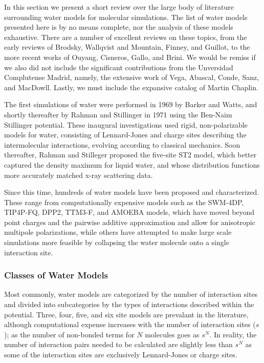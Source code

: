 In this section we present a short review over the large body of
literature surrounding water models for molecular simulations. The
list of water models presented here is by no means complete, nor the
analysis of these models exhaustive. There are a number of excellent
reviews on these topics, from the early reviews of
Brodsky\cite{Brodsky1996}, Wallqvist and Mountain\cite{Wallqvist1999},
Finney\cite{Finney2001}, and Guillot\cite{Guillot2002}, to the more
recent works of Ouyang\cite{Ouyang2015}, Cisneros\cite{Cisneros2016},
Gallo\cite{Gallo2016}, and Brini\cite{Brini2017}. We would be remiss
if we also did not include the significant contributions from the
Unversidad Complutense Madrid, namely, the extensive work of Vega,
Abascal, Conde, Sanz, and
MacDowll.\cite{MacDowell2004,Vega2005,Vega2005c,Abascal2007,Abascal2007a,Abascal2007b,Abascal2007c,Vega2009,Vega2011,Vega2011a,Vega2015}
Lastly, we must include the expansive catalog of Martin
Chaplin.\cite{Chaplin2018}

The first simulations of water were performed in 1969 by Barker and
Watts,\cite{Barker1969} and shortly thereafter by Rahman and
Stillinger in 1971\cite{Rahman1971} using the Ben-Naim Stillinger
potential\cite{Ben-Naim1972}. These inaugural investigations used
rigid, non-polarizable models for water, consisting of Lennard-Jones
and charge sites describing the intermolecular interactions, evolving
according to classical mechanics. Soon thereafter, Rahman and
Stilleger proposed the five-site ST2 model, which better captured the
density maximum for liquid water, and whose distribution functions
more accurately matched x-ray scattering data.\cite{Stillinger1974}

Since this time, hundreds of water models have been proposed and
characterized.\cite{Chaplin2018} These range from computationally
expensive models such as the SWM-4DP\cite{Lamourex2003},
TIP4P-FQ\cite{Rick1994}, DPP2\cite{Kumar2010},
TTM3-F\cite{Fanourgakis2008}, and AMOEBA\cite{Ren2003,Ren2004} models,
which have moved beyond point charges and the pairwise additive
approximation and allow for anisotropic multipole polarizations, while
others have attempted to make large scale simulations more feasible by
collapsing the water molecule onto a single interaction
site\cite{Liu1996,Tan2003,Fennell2004}.

\subsubsection{Classes of Water Models}
Most commonly, water models are categorized by the number of
interaction sites and divided into subcategories by the types of
interactions described within the potential. Three, four, five, and
six site models are prevalant in the literature, although
computational expense increases with the number of interaction sites
($s$); as the number of non-bonded terms for $N$ molecules goes as
$s^N$. In reality, the number of interaction pairs needed to be
calculated are slightly less than $s^N$ as some of the interaction
sites are exclusively Lennard-Jones or charge sites.

